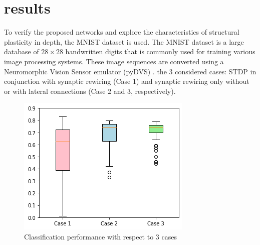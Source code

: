 \documentclass[sigconf]{acmart}
\begin{document}
\section{results}\label{section:results}

To verify the proposed networks and explore the characteristics of structural plasticity in depth, the MNIST dataset is used. 
The MNIST dataset is a large database of $28 \times 28$ handwritten digits that is commonly used for training various image processing systems. 
These image sequences are converted using a Neuromorphic Vision Sensor emulator (pyDVS) \cite{garcia2016pydvs}.
the 3 considered cases: STDP in conjunction with synaptic rewiring (Case 1) and synaptic rewiring only without or with lateral connections (Case 2 and 3, respectively).

\begin{figure}[tbh]
    \centering
    \includegraphics[width=0.80\linewidth, trim=0cm 0cm 0cm 0cm, clip=true]{10trials/boxPlotCase}
    \caption{Classification performance with respect to 3 cases}
    \label{fig:bpWCases}
\end{figure}
\end{document}
